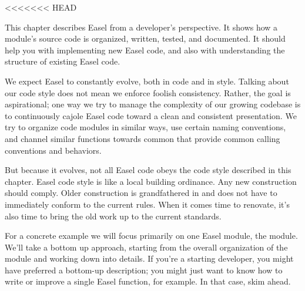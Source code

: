 <<<<<<< HEAD

This chapter describes Easel from a developer's perspective. It shows
how a module's source code is organized, written, tested, and
documented. It should help you with implementing new Easel code, and
also with understanding the structure of existing Easel code.

We expect Easel to constantly evolve, both in code and in style.
Talking about our code style does not mean we enforce foolish
consistency. Rather, the goal is aspirational; one way we try to
manage the complexity of our growing codebase is to continuously
cajole Easel code toward a clean and consistent presentation. We try
to organize code modules in similar ways, use certain naming
conventions, and channel similar functions towards common
 that provide common calling conventions and
behaviors.

But because it evolves, not all Easel code obeys the code style
described in this chapter. Easel code style is like a local building
ordinance. Any new construction should comply. Older construction is
grandfathered in and does not have to immediately conform to the
current rules. When it comes time to renovate, it's also time to bring
the old work up to the current standards.

For a concrete example we will focus primarily on one Easel module,
the  module. We'll take a bottom up approach, starting
from the overall organization of the module and working down into
details. If you're a starting developer, you might have preferred a
bottom-up description; you might just want to know how to write or
improve a single Easel function, for example. In that case, skim
ahead.


